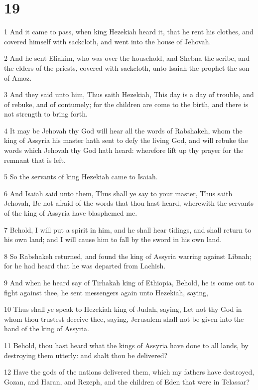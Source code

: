 \chapter{19}

\par 1 And it came to pass, when king Hezekiah heard it, that he rent his clothes, and covered himself with sackcloth, and went into the house of Jehovah.
\par 2 And he sent Eliakim, who was over the household, and Shebna the scribe, and the elders of the priests, covered with sackcloth, unto Isaiah the prophet the son of Amoz.
\par 3 And they said unto him, Thus saith Hezekiah, This day is a day of trouble, and of rebuke, and of contumely; for the children are come to the birth, and there is not strength to bring forth.
\par 4 It may be Jehovah thy God will hear all the words of Rabshakeh, whom the king of Assyria his master hath sent to defy the living God, and will rebuke the words which Jehovah thy God hath heard: wherefore lift up thy prayer for the remnant that is left.
\par 5 So the servants of king Hezekiah came to Isaiah.
\par 6 And Isaiah said unto them, Thus shall ye say to your master, Thus saith Jehovah, Be not afraid of the words that thou hast heard, wherewith the servants of the king of Assyria have blasphemed me.
\par 7 Behold, I will put a spirit in him, and he shall hear tidings, and shall return to his own land; and I will cause him to fall by the sword in his own land.
\par 8 So Rabshakeh returned, and found the king of Assyria warring against Libnah; for he had heard that he was departed from Lachish.
\par 9 And when he heard say of Tirhakah king of Ethiopia, Behold, he is come out to fight against thee, he sent messengers again unto Hezekiah, saying,
\par 10 Thus shall ye speak to Hezekiah king of Judah, saying, Let not thy God in whom thou trustest deceive thee, saying, Jerusalem shall not be given into the hand of the king of Assyria.
\par 11 Behold, thou hast heard what the kings of Assyria have done to all lands, by destroying them utterly: and shalt thou be delivered?
\par 12 Have the gods of the nations delivered them, which my fathers have destroyed, Gozan, and Haran, and Rezeph, and the children of Eden that were in Telassar?
